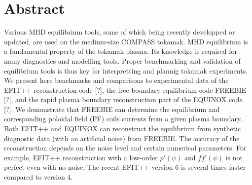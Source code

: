 \section{Abstract}

Various MHD equilibrium tools, some of which being recently developped or updated, are used on the medium-size COMPASS tokamak. MHD equilibrium is a fundamental property of the tokamak plasma. Its knowledge is required for many diagnostics and modelling tools. Proper benchmarking and validation of equilibrium tools is thus key for interpretting and plannig tokamak experiments. We present here benchmarks and comparisons to experimental data of the EFIT++ reconstruction code [?], the free-boundary equilibrium code FREEBIE [?], and the rapid plasma boundary reconstruction part of the EQUINOX code [?]. We demonstrate that FREEBIE can determine the equilibrium and corresponding poloidal field (PF) coils currents from a given plasma boundary. Both EFIT++ and EQUINOX can reconstruct the equilibrium from synthetic diagnostic data (with an artificial noise) from FREEBIE. The accuracy of the reconstruction depends on the noise level and certain numerical parameters. For example, EFIT++ reconstruction with a low-order $p'\left(\psi\right)$ and $ff'\left(\psi\right)$ is not perfect even with no noise. The recent EFIT++ version 6 is several times faster compared to version 4.